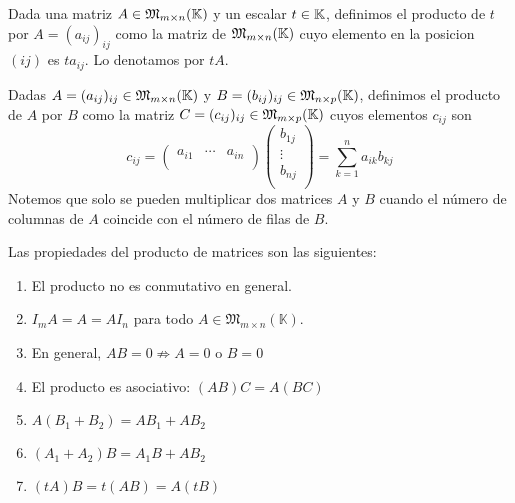 \begin{definition}
	Dada una matriz \(A \in \mathfrak{\MakeUppercase{m}}_{m\times n}(\K )\) y un escalar \(t \in  \mathbb{K} \), definimos el producto de \(t \) por \(A = (a_{ij})_{ij}\) como la matriz de \(\mathfrak{\MakeUppercase{m}}_{m \times n}(\K )\) cuyo elemento en la posicion \((ij )\) es \(ta_{ij }\). Lo denotamos por \(tA \).
\end{definition}
\begin{definition}
	Dadas \(A = (a_{ij})_{ij} \in \mathfrak{\MakeUppercase{m}}_{m \times n}(\K)\) y \(B = (b_{ij})_{ij} \in \mathfrak{\MakeUppercase{m}}_{n \times p}(\K )\), definimos el producto de \(A \) por \(B \) como la matriz \(C = (c_{ij})_{ij} \in  \mathfrak{\MakeUppercase{M}}_{m \times p}(\K)\) cuyos elementos \(c_{ij }\) son
	\[
		c_{ij} = \begin{pmatrix}
			a_{i1 } & \cdots & a_{in } \\
		\end{pmatrix} \begin{pmatrix}
			b_{1j } \\
			\vdots  \\
			b_{nj}  \\
		\end{pmatrix} = \sum_{k =1}^{n } a_{ik}b_{kj}
	\]
	Notemos que solo se pueden multiplicar dos matrices \(A \) y \(B \) cuando el número de columnas de \(A \) coincide con el número de filas de \(B \).
\end{definition}
\begin{proposition}
	Las propiedades del producto de matrices son las siguientes:
	\begin{enumerate}
		\item El producto no es conmutativo en general.
		\item \(I_m A = A = AI_n \) para todo \(A \in  \mathfrak{M}_{m \times n}(\mathbb{K})\).
		\item En general, \(AB = 0 \not\Rightarrow A = 0 \text{ o } B = 0 \)
		\item El producto es asociativo: \((AB)C = A(BC)\)
		\item \(A(B_1+B_2) = AB_1 + AB_2\)
		\item \((A_1 + A_2)B = A_1 B + AB_2\)
		\item \((tA)B = t(AB) = A(tB)\)
	\end{enumerate}
\end{proposition}

